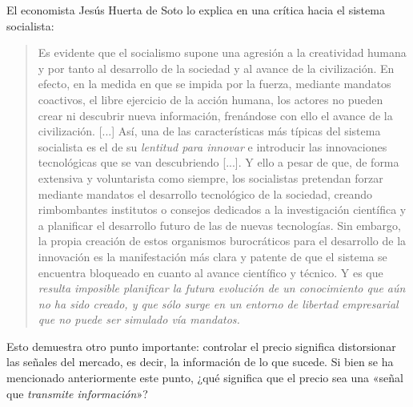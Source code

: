 \documentclass[12pt,a4paper,twoside]{book}
\begin{document}
El economista Jesús Huerta de Soto lo explica en una crítica hacia el sistema socialista: 

\begin{quotation}
Es evidente que el socialismo supone una agresión a la creatividad humana y por tanto al desarrollo de la sociedad y al avance de la civilización. En efecto, en la medida en que se impida por la fuerza, mediante mandatos coactivos, el libre ejercicio de la acción humana, los actores no pueden crear ni descubrir nueva información, frenándose con ello el avance de la civilización. [...] Así, una de las características más típicas del sistema socialista es el de su \textit{lentitud para innovar} e introducir las innovaciones tecnológicas que se van descubriendo [...]. Y ello a pesar de que, de forma extensiva y voluntarista como siempre, los socialistas pretendan forzar mediante mandatos el desarrollo tecnológico de la sociedad, creando rimbombantes institutos o consejos dedicados a la investigación científica y a planificar el desarrollo futuro de las de nuevas tecnologías. Sin embargo, la propia creación de estos organismos burocráticos para el desarrollo de la innovación es la manifestación más clara y patente de que el sistema se encuentra bloqueado en cuanto al avance científico y técnico. Y es que \textit{resulta imposible planificar la futura evolución de un conocimiento que aún no ha sido creado, y que sólo surge en un entorno de libertad empresarial que no puede ser simulado vía mandatos.} \cite[págs. 124-125]{huertasoto:socialismo}
\end{quotation}

Esto demuestra otro punto importante: controlar el precio significa distorsionar las señales del mercado, es decir, la información de lo que sucede. Si bien se ha mencionado anteriormente este punto, ¿qué significa que el precio sea una «señal que \textit{transmite información}»? 
\end{document}
